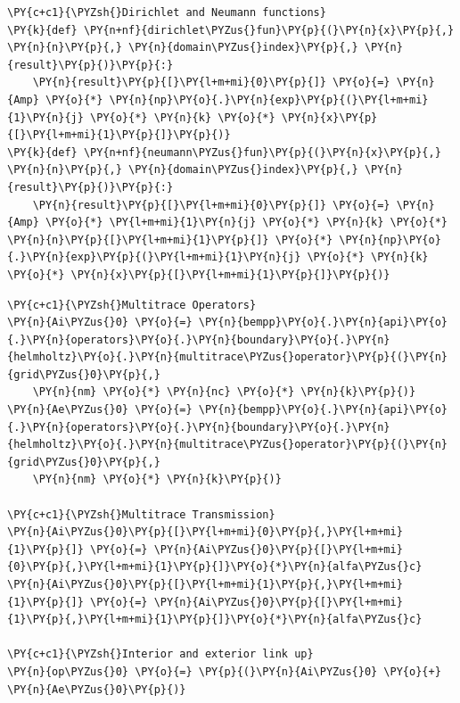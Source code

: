 \begin{tcolorbox}
\begin{Verbatim}[commandchars=\\\{\}]
\PY{c+c1}{\PYZsh{}Dirichlet and Neumann functions}
\PY{k}{def} \PY{n+nf}{dirichlet\PYZus{}fun}\PY{p}{(}\PY{n}{x}\PY{p}{,} \PY{n}{n}\PY{p}{,} \PY{n}{domain\PYZus{}index}\PY{p}{,} \PY{n}{result}\PY{p}{)}\PY{p}{:}
	\PY{n}{result}\PY{p}{[}\PY{l+m+mi}{0}\PY{p}{]} \PY{o}{=} \PY{n}{Amp} \PY{o}{*} \PY{n}{np}\PY{o}{.}\PY{n}{exp}\PY{p}{(}\PY{l+m+mi}{1}\PY{n}{j} \PY{o}{*} \PY{n}{k} \PY{o}{*} \PY{n}{x}\PY{p}{[}\PY{l+m+mi}{1}\PY{p}{]}\PY{p}{)}
\PY{k}{def} \PY{n+nf}{neumann\PYZus{}fun}\PY{p}{(}\PY{n}{x}\PY{p}{,} \PY{n}{n}\PY{p}{,} \PY{n}{domain\PYZus{}index}\PY{p}{,} \PY{n}{result}\PY{p}{)}\PY{p}{:}
	\PY{n}{result}\PY{p}{[}\PY{l+m+mi}{0}\PY{p}{]} \PY{o}{=} \PY{n}{Amp} \PY{o}{*} \PY{l+m+mi}{1}\PY{n}{j} \PY{o}{*} \PY{n}{k} \PY{o}{*} \PY{n}{n}\PY{p}{[}\PY{l+m+mi}{1}\PY{p}{]} \PY{o}{*} \PY{n}{np}\PY{o}{.}\PY{n}{exp}\PY{p}{(}\PY{l+m+mi}{1}\PY{n}{j} \PY{o}{*} \PY{n}{k} \PY{o}{*} \PY{n}{x}\PY{p}{[}\PY{l+m+mi}{1}\PY{p}{]}\PY{p}{)}
\end{Verbatim}
\end{tcolorbox}


\begin{tcolorbox}
\begin{Verbatim}[commandchars=\\\{\}]
\PY{c+c1}{\PYZsh{}Multitrace Operators}
\PY{n}{Ai\PYZus{}0} \PY{o}{=} \PY{n}{bempp}\PY{o}{.}\PY{n}{api}\PY{o}{.}\PY{n}{operators}\PY{o}{.}\PY{n}{boundary}\PY{o}{.}\PY{n}{helmholtz}\PY{o}{.}\PY{n}{multitrace\PYZus{}operator}\PY{p}{(}\PY{n}{grid\PYZus{}0}\PY{p}{,} 
	\PY{n}{nm} \PY{o}{*} \PY{n}{nc} \PY{o}{*} \PY{n}{k}\PY{p}{)}
\PY{n}{Ae\PYZus{}0} \PY{o}{=} \PY{n}{bempp}\PY{o}{.}\PY{n}{api}\PY{o}{.}\PY{n}{operators}\PY{o}{.}\PY{n}{boundary}\PY{o}{.}\PY{n}{helmholtz}\PY{o}{.}\PY{n}{multitrace\PYZus{}operator}\PY{p}{(}\PY{n}{grid\PYZus{}0}\PY{p}{,} 
	\PY{n}{nm} \PY{o}{*} \PY{n}{k}\PY{p}{)}
        
\PY{c+c1}{\PYZsh{}Multitrace Transmission}
\PY{n}{Ai\PYZus{}0}\PY{p}{[}\PY{l+m+mi}{0}\PY{p}{,}\PY{l+m+mi}{1}\PY{p}{]} \PY{o}{=} \PY{n}{Ai\PYZus{}0}\PY{p}{[}\PY{l+m+mi}{0}\PY{p}{,}\PY{l+m+mi}{1}\PY{p}{]}\PY{o}{*}\PY{n}{alfa\PYZus{}c}
\PY{n}{Ai\PYZus{}0}\PY{p}{[}\PY{l+m+mi}{1}\PY{p}{,}\PY{l+m+mi}{1}\PY{p}{]} \PY{o}{=} \PY{n}{Ai\PYZus{}0}\PY{p}{[}\PY{l+m+mi}{1}\PY{p}{,}\PY{l+m+mi}{1}\PY{p}{]}\PY{o}{*}\PY{n}{alfa\PYZus{}c}
        
\PY{c+c1}{\PYZsh{}Interior and exterior link up}
\PY{n}{op\PYZus{}0} \PY{o}{=} \PY{p}{(}\PY{n}{Ai\PYZus{}0} \PY{o}{+} \PY{n}{Ae\PYZus{}0}\PY{p}{)}
\end{Verbatim}
\end{tcolorbox}

